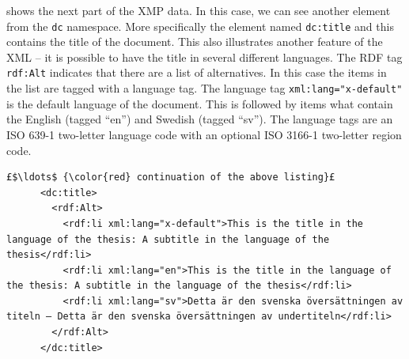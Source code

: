  shows the next part of the XMP data. In this case, we can see another element from the \texttt{dc} namespace. More specifically the element named \texttt{dc:title} and this contains the title of the document. This also illustrates another feature of the XML -- it is possible to have the title in several different languages. The RDF tag \texttt{rdf:Alt} indicates that there are a list of alternatives. In this case the items in the list are tagged with a language tag. The language tag \texttt{xml:lang="x-default"} is the default language of the document. This is followed by items what contain the English (tagged ``en'') and Swedish (tagged ``sv''). The language tags are an ISO 639-1 two-letter language code with an
optional ISO 3166-1 two-letter region code.
\begin{lstlisting}[style=myXML,
caption={The \texttt{dc:title>} metadata embedded in a PDF file (some reformatting has been done to fit the text in the boarders)}, label={lst:pdfinfoOutputPart6}]
£$\ldots$ {\color{red} continuation of the above listing}£ 
      <dc:title>
        <rdf:Alt>
          <rdf:li xml:lang="x-default">This is the title in the language of the thesis: A subtitle in the language of the thesis</rdf:li>
          <rdf:li xml:lang="en">This is the title in the language of the thesis: A subtitle in the language of the thesis</rdf:li>
          <rdf:li xml:lang="sv">Detta är den svenska översättningen av titeln – Detta är den svenska översättningen av undertiteln</rdf:li>
        </rdf:Alt>
      </dc:title>
\end{lstlisting}

